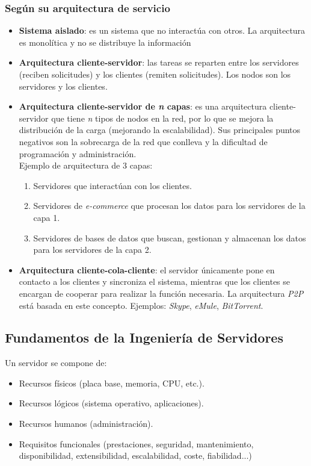 \documentclass[12pt,spanish]{article}
\begin{document}
\subsubsection{Según su arquitectura de servicio}
\begin{itemize}
	\item \textbf{Sistema aislado}: es un sistema que no interactúa con otros. La arquitectura es monolítica y no se distribuye la información
	\item \textbf{Arquitectura cliente-servidor}: las tareas se reparten entre los servidores (reciben solicitudes) y los clientes (remiten solicitudes). Los nodos son los servidores y los clientes.
	\item \textbf{Arquitectura cliente-servidor de \emph{n} capas}: es una arquitectura cliente-servidor que tiene \emph{n} tipos de nodos en la red, por lo que se mejora la distribución de la carga (mejorando la escalabilidad). Sus principales puntos negativos son la sobrecarga de la red que conlleva y la dificultad de programación y administración.\\
	Ejemplo de arquitectura de 3 capas:
	\begin{enumerate}
		\item Servidores que interactúan con los clientes.
		\item Servidores de \textit{e-commerce} que procesan los datos para los servidores de la capa 1.
		\item Servidores de bases de datos que buscan, gestionan y almacenan los datos para los servidores de la capa 2.
	\end{enumerate}
	\item \textbf{Arquitectura cliente-cola-cliente}: el servidor únicamente pone en contacto a los clientes y sincroniza el sistema, mientras que los clientes se encargan de cooperar para realizar la función necesaria. La arquitectura \textit{P2P} está basada en este concepto. Ejemplos: \textit{Skype}, \textit{eMule}, \textit{BitTorrent}.
\end{itemize}

\subsection{Fundamentos de la Ingeniería de Servidores}

Un servidor se compone de:
\begin{itemize}
	\item Recursos físicos (placa base, memoria, CPU, etc.).
	\item Recursos lógicos (sistema operativo, aplicaciones).
	\item Recursos humanos (administración).
	\item Requisitos funcionales (prestaciones, seguridad, mantenimiento, disponibilidad, extensibilidad, escalabilidad, coste, fiabilidad...)
\end{itemize}
\end{document}
